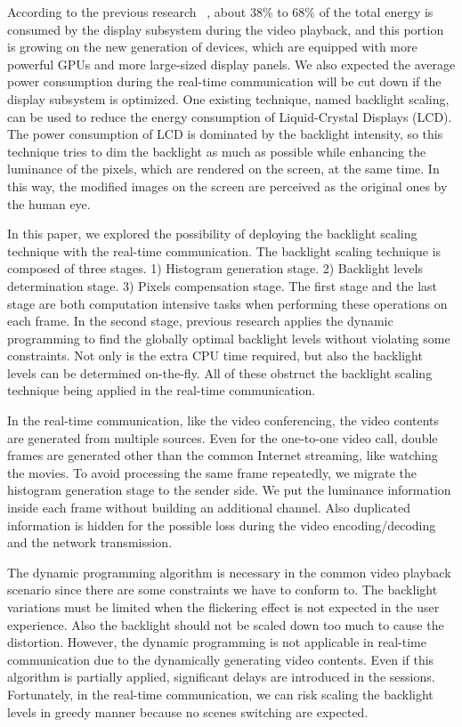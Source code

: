 According to the previous research ~\cite{AG10}, about 38\% to 68\% of the
total energy is consumed by the display subsystem during the video
playback, and this portion is growing on the new generation of
devices, which are equipped with more powerful GPUs and more
large-sized display panels. We also expected the average power
consumption during the real-time communication will be cut down if the
display subsystem is optimized. One existing technique, named
backlight scaling, can be used to reduce the energy consumption of
Liquid-Crystal Displays (LCD). The power consumption of LCD is
dominated by the backlight intensity, so this technique tries to dim
the backlight as much as possible while enhancing the luminance of the
pixels, which are rendered on the screen, at the same time. In this
way, the modified images on the screen are perceived as the original
ones by the human eye.  


In this paper, we explored the possibility of deploying the backlight
scaling technique with the real-time communication. The backlight
scaling technique is composed of three stages. 1) Histogram generation
stage. 2) Backlight levels determination stage. 3) Pixels compensation
stage. The first stage and the last stage are both computation
intensive tasks when performing these operations on each frame. In the
second stage, previous research applies the dynamic programming to
find the globally optimal backlight levels without violating some
constraints. Not only is the extra CPU time required, but also the
backlight levels can be determined on-the-fly. All of these obstruct
the backlight scaling technique being applied in the real-time
communication.

In the real-time communication, like the video conferencing, the video
contents are generated from multiple sources. Even for the one-to-one
video call, double frames are generated other than the common Internet
streaming, like watching the movies. To avoid processing the same
frame repeatedly, we migrate the histogram generation stage to the
sender side. We put the luminance information inside each frame
without building an additional channel. Also duplicated information is
hidden for the possible loss during the video encoding/decoding and
the network transmission.

The dynamic programming algorithm is necessary in the common video
playback scenario since there are some constraints we have to conform
to. The backlight variations must be limited when the flickering
effect is not expected in the user experience. Also the backlight
should not be scaled down too much to cause the distortion. However,
the dynamic programming is not applicable in real-time communication
due to the dynamically generating video contents. Even if this
algorithm is partially applied, significant delays are introduced in
the sessions. Fortunately, in the real-time communication, we can risk
scaling the backlight levels in greedy manner because no scenes
switching are expected. 

